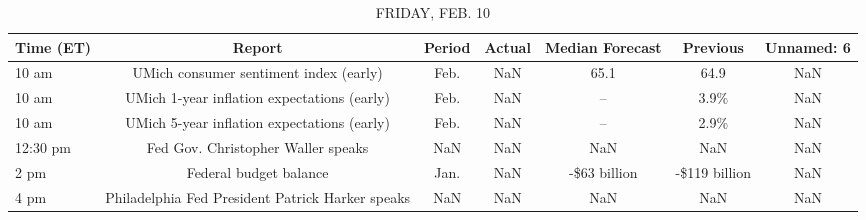 \documentclass{article}%
\begin{document}
%


\begin{table}[htbp]%
\caption{FRIDAY, FEB. 10}%
\centering%
\begin{adjustbox}{width=1\textwidth}%
\begin{tabular}{lcccccc}
\toprule
Time (ET) &                                           Report & Period & Actual & Median Forecast &      Previous & Unnamed: 6 \\
\midrule
    10 am &           UMich consumer sentiment index (early) &   Feb. &    NaN &            65.1 &          64.9 &        NaN \\
    10 am &      UMich 1-year inflation expectations (early) &   Feb. &    NaN &              -- &          3.9\% &        NaN \\
    10 am &      UMich 5-year inflation expectations (early) &   Feb. &    NaN &              -- &          2.9\% &        NaN \\
 12:30 pm &               Fed Gov. Christopher Waller speaks &    NaN &    NaN &             NaN &           NaN &        NaN \\
     2 pm &                           Federal budget balance &   Jan. &    NaN &    -\$63 billion & -\$119 billion &        NaN \\
     4 pm & Philadelphia Fed President Patrick Harker speaks &    NaN &    NaN &             NaN &           NaN &        NaN \\
\bottomrule
\end{tabular}
%
\end{adjustbox}%
\end{table}
\end{document}
